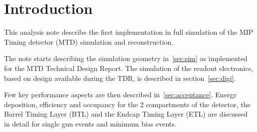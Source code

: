 \section{Introduction}
This analysis note describe the first implementation in full simulation of the MIP Timing detector (MTD) simulation and reconstruction.

The note starts describing the simulation geometry in~\ref{sec:sim} as implemented for the MTD Technical Design Report. The simulation of the readout electronics, based on design available during the TDR, is described in section~\ref{sec:digi}.

Few key performance aspects are then described in~\ref{sec:acceptance}. Energy deposition, efficiency and occupancy for the 2 compartments of the detector, the Barrel Timing Layer (BTL) and the Endcap Timing Layer (ETL) are discussed in detail for single gun events and minimum bias events.
